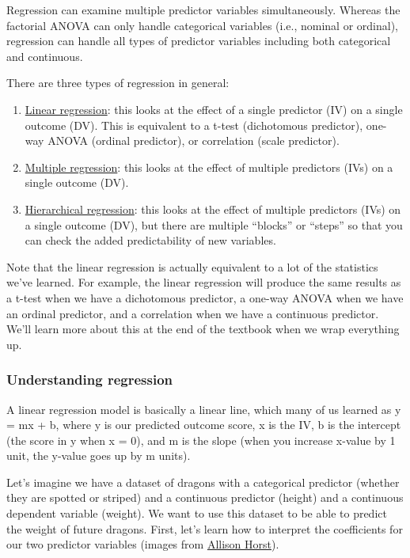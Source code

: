 \documentclass[
]{book}
\begin{document}
Regression can examine multiple predictor variables simultaneously. Whereas the factorial ANOVA can only handle categorical variables (i.e., nominal or ordinal), regression can handle all types of predictor variables including both categorical and continuous.

There are three types of regression in general:

\begin{enumerate}
\def\labelenumi{\arabic{enumi}.}
\item
  \underline{Linear regression}: this looks at the effect of a single predictor (IV) on a single outcome (DV). This is equivalent to a t-test (dichotomous predictor), one-way ANOVA (ordinal predictor), or correlation (scale predictor).
\item
  \underline{Multiple regression}: this looks at the effect of multiple predictors (IVs) on a single outcome (DV).
\item
  \underline{Hierarchical regression}: this looks at the effect of multiple predictors (IVs) on a single outcome (DV), but there are multiple ``blocks'' or ``steps'' so that you can check the added predictability of new variables.
\end{enumerate}

Note that the linear regression is actually equivalent to a lot of the statistics we've learned. For example, the linear regression will produce the same results as a t-test when we have a dichotomous predictor, a one-way ANOVA when we have an ordinal predictor, and a correlation when we have a continuous predictor. We'll learn more about this at the end of the textbook when we wrap everything up.

\hypertarget{understanding-regression}{%
\subsubsection{Understanding regression}\label{understanding-regression}}

A linear regression model is basically a linear line, which many of us learned as y = mx + b, where y is our predicted outcome score, x is the IV, b is the intercept (the score in y when x = 0), and m is the slope (when you increase x-value by 1 unit, the y-value goes up by m units).

Let's imagine we have a dataset of dragons with a categorical predictor (whether they are spotted or striped) and a continuous predictor (height) and a continuous dependent variable (weight). We want to use this dataset to be able to predict the weight of future dragons. First, let's learn how to interpret the coefficients for our two predictor variables (images from \href{https://github.com/allisonhorst/stats-illustrations\#multiple-linear-regression-dragons-thread}{Allison Horst}).
\end{document}
